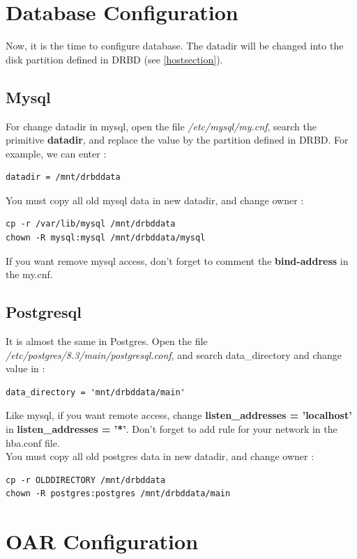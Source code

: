 \documentclass[a4paper,10pt]{report}
\begin{document}
\section{Database Configuration}
Now, it is the time to configure database. The datadir will be changed into the disk partition defined in DRBD (see  \ref{hostsection}).

\subsection{Mysql}
For change datadir in mysql, open the file \textit{/etc/mysql/my.cnf}, search the primitive \textbf{datadir}, and replace the value by the partition defined in DRBD.
For example, we can enter :
\begin{lstlisting}
datadir = /mnt/drbddata
\end{lstlisting}
You must copy all old mysql data in new datadir, and change owner :
\begin{lstlisting}
cp -r /var/lib/mysql /mnt/drbddata
chown -R mysql:mysql /mnt/drbddata/mysql
\end{lstlisting}
If you want remove mysql access, don't forget to comment the \textbf{bind-address} in the my.cnf.

\subsection{Postgresql}
It is almost the same in Postgres. Open the file \textit{/etc/postgres/8.3/main/postgresql.conf}, and search data\_directory and change value in :
\begin{lstlisting}
data_directory = 'mnt/drbddata/main'
\end{lstlisting}
Like mysql, if you want remote access, change \textbf{listen\_addresses = 'localhost'} in \textbf{listen\_addresses = '*'}. Don't forget to add rule for your network in the hba.conf file.\\
You must copy all old postgres data in new datadir, and change owner :
\begin{lstlisting}
cp -r OLDDIRECTORY /mnt/drbddata
chown -R postgres:postgres /mnt/drbddata/main
\end{lstlisting}



\section{OAR Configuration}
\end{document}
